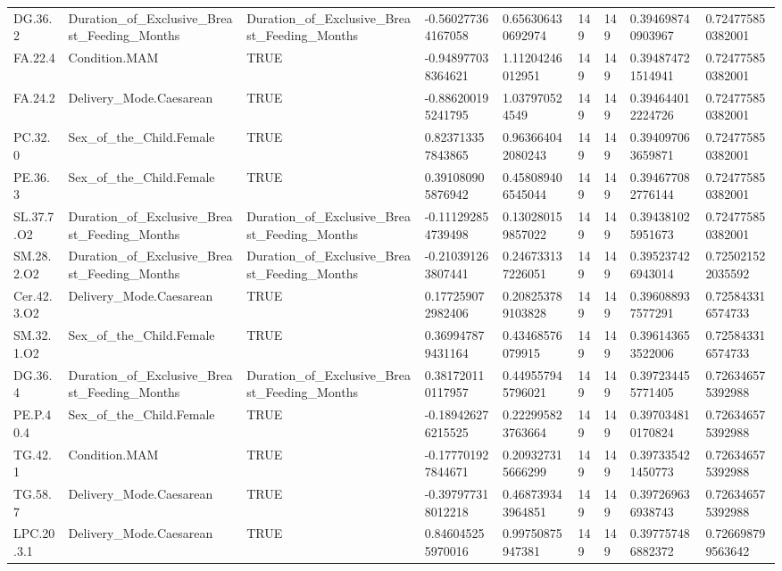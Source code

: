 \begin{longtable}{lllllllll}
DG.36.2 & Duration\_of\_Exclusive\_Breast\_Feeding\_Months & Duration\_of\_Exclusive\_Breast\_Feeding\_Months & -0.560277364167058 & 0.656306430692974 & 149 & 149 & 0.394698740903967 & 0.724775850382001 \\
FA.22.4 & Condition.MAM & TRUE & -0.948977038364621 & 1.11204246012951 & 149 & 149 & 0.394874721514941 & 0.724775850382001 \\
FA.24.2 & Delivery\_Mode.Caesarean & TRUE & -0.886200195241795 & 1.037970524549 & 149 & 149 & 0.394644012224726 & 0.724775850382001 \\
PC.32.0 & Sex\_of\_the\_Child.Female & TRUE & 0.823713357843865 & 0.963664042080243 & 149 & 149 & 0.394097063659871 & 0.724775850382001 \\
PE.36.3 & Sex\_of\_the\_Child.Female & TRUE & 0.391080905876942 & 0.458089406545044 & 149 & 149 & 0.394677082776144 & 0.724775850382001 \\
SL.37.7.O2 & Duration\_of\_Exclusive\_Breast\_Feeding\_Months & Duration\_of\_Exclusive\_Breast\_Feeding\_Months & -0.111292854739498 & 0.130280159857022 & 149 & 149 & 0.394381025951673 & 0.724775850382001 \\
SM.28.2.O2 & Duration\_of\_Exclusive\_Breast\_Feeding\_Months & Duration\_of\_Exclusive\_Breast\_Feeding\_Months & -0.210391263807441 & 0.246733137226051 & 149 & 149 & 0.395237426943014 & 0.725021522035592 \\
Cer.42.3.O2 & Delivery\_Mode.Caesarean & TRUE & 0.177259072982406 & 0.208253789103828 & 149 & 149 & 0.396088937577291 & 0.725843316574733 \\
SM.32.1.O2 & Sex\_of\_the\_Child.Female & TRUE & 0.369947879431164 & 0.43468576079915 & 149 & 149 & 0.396143653522006 & 0.725843316574733 \\
DG.36.4 & Duration\_of\_Exclusive\_Breast\_Feeding\_Months & Duration\_of\_Exclusive\_Breast\_Feeding\_Months & 0.381720110117957 & 0.449557945796021 & 149 & 149 & 0.397234455771405 & 0.726346575392988 \\
PE.P.40.4 & Sex\_of\_the\_Child.Female & TRUE & -0.189426276215525 & 0.222995823763664 & 149 & 149 & 0.397034810170824 & 0.726346575392988 \\
TG.42.1 & Condition.MAM & TRUE & -0.177701927844671 & 0.209327315666299 & 149 & 149 & 0.397335421450773 & 0.726346575392988 \\
TG.58.7 & Delivery\_Mode.Caesarean & TRUE & -0.397977318012218 & 0.468739343964851 & 149 & 149 & 0.397269636938743 & 0.726346575392988 \\
LPC.20.3.1 & Delivery\_Mode.Caesarean & TRUE & 0.846045255970016 & 0.99750875947381 & 149 & 149 & 0.397757486882372 & 0.726698799563642 \\

\end{longtable}
